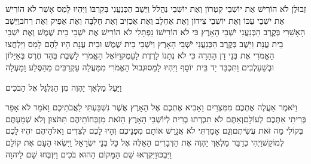 \documentclass[../main/main.tex]{subfiles}
\begin{document}
\begin{multicols*}{\ncols}
זְבוּלֻן לֹא הוֹרִישׁ אֶת יוֹשְׁבֵי קִטְרוֹן וְאֶת יוֹשְׁבֵי נַהֲלֹל וַיֵּשֶׁב הַכְּנַעֲנִי בְּקִרְבּוֹ וַיִּהְיוּ לָמַס \ClosedSection{}אָשֵׁר לֹא הוֹרִישׁ אֶת יֹשְׁבֵי עַכּוֹ וְאֶת יוֹשְׁבֵי צִידוֹן וְאֶת אַחְלָב וְאֶת אַכְזִיב וְאֶת חֶלְבָּה וְאֶת אֲפִיק וְאֶת רְחֹב\PreVerseSpace{}וַיֵּשֶׁב הָאָשֵׁרִי בְּקֶרֶב הַכְּנַעֲנִי יֹשְׁבֵי הָאָרֶץ כִּי לֹא הוֹרִישׁוֹ \ClosedSection{}נַפְתָּלִי לֹא הוֹרִישׁ אֶת יֹשְׁבֵי בֵית שֶׁמֶשׁ וְאֶת יֹשְׁבֵי בֵית עֲנָת וַיֵּשֶׁב בְּקֶרֶב הַכְּנַעֲנִי יֹשְׁבֵי הָאָרֶץ וְיֹשְׁבֵי בֵית שֶׁמֶשׁ וּבֵית עֲנָת הָיוּ לָהֶם לָמַס \ClosedSection{}וַיִּלְחֲצוּ הָאֱמֹרִי אֶת בְּנֵי דָן הָהָרָה כִּי לֹא נְתָנוֹ לָרֶדֶת לָעֵמֶק\PreVerseSpace{}וַיּוֹאֶל הָאֱמֹרִי לָשֶׁבֶת בְּהַר חֶרֶס בְּאַיָּלוֹן וּבְשַׁעַלְבִים וַתִּכְבַּד יַד בֵּית יוֹסֵף וַיִּהְיוּ לָמַס\PreVerseSpace{}וּגְבוּל הָאֱמֹרִי מִמַּעֲלֵה עַקְרַבִּים מֵהַסֶּלַע וָמָעְלָה\OpenSection{}\par
{}וַיַּעַל מַלְאַךְ יַהְוֶה מִן הַגִּלְגָּל אֶל הַבֹּכִים\OpenSection{}\par
וַיֹּאמֶר אַעֲלֶה אֶתְכֶם מִמִּצְרַיִם וָאָבִיא אֶתְכֶם אֶל הָאָרֶץ אֲשֶׁר נִשְׁבַּעְתִּי לַאֲבֹתֵיכֶם וָאֹמַר לֹא אָפֵר בְּרִיתִי אִתְּכֶם לְעוֹלָם\PreVerseSpace{}וְאַתֶּם לֹא תִכְרְתוּ בְרִית לְיוֹשְׁבֵי הָאָרֶץ הַזֹּאת מִזְבְּחוֹתֵיהֶם תִּתֹּצוּן וְלֹא שְׁמַעְתֶּם בְּקוֹלִי מַה זֹּאת עֲשִׂיתֶם\PreVerseSpace{}וְגַם אָמַרְתִּי לֹא אֲגָרֵשׁ אוֹתָם מִפְּנֵיכֶם וְהָיוּ לָכֶם לְצִדִּים וֵאלֹהֵיהֶם יִהְיוּ לָכֶם לְמוֹקֵשׁ\PreVerseSpace{}וַיְהִי כְּדַבֵּר מַלְאַךְ יַהְוֶה אֶת הַדְּבָרִים הָאֵלֶּה אֶל כָּל בְּנֵי יִשְׂרָאֵל וַיִּשְׂאוּ הָעָם אֶת קוֹלָם וַיִּבְכּוּ\PreVerseSpace{}וַיִּקְרְאוּ שֵׁם הַמָּקוֹם הַהוּא בֹּכִים וַיִּזְבְּחוּ שָׁם לַיהוָה\OpenSection{}\par

\end{multicols*}
\end{document}
